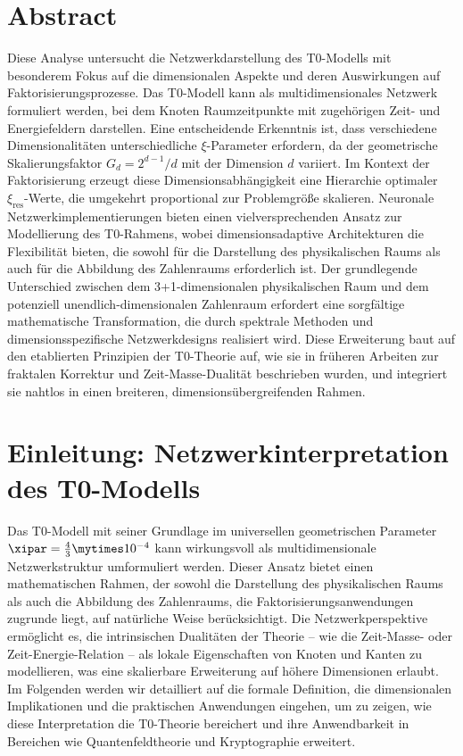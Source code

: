 \section*{Abstract}
	Diese Analyse untersucht die Netzwerkdarstellung des T0-Modells mit besonderem Fokus auf die dimensionalen Aspekte und deren Auswirkungen auf Faktorisierungsprozesse. Das T0-Modell kann als multidimensionales Netzwerk formuliert werden, bei dem Knoten Raumzeitpunkte mit zugehörigen Zeit- und Energiefeldern darstellen. Eine entscheidende Erkenntnis ist, dass verschiedene Dimensionalitäten unterschiedliche $\xi$-Parameter erfordern, da der geometrische Skalierungsfaktor $G_d = 2^{d-1}/d$ mit der Dimension $d$ variiert. Im Kontext der Faktorisierung erzeugt diese Dimensionsabhängigkeit eine Hierarchie optimaler $\xi_{\text{res}}$-Werte, die umgekehrt proportional zur Problemgröße skalieren. Neuronale Netzwerkimplementierungen bieten einen vielversprechenden Ansatz zur Modellierung des T0-Rahmens, wobei dimensionsadaptive Architekturen die Flexibilität bieten, die sowohl für die Darstellung des physikalischen Raums als auch für die Abbildung des Zahlenraums erforderlich ist. Der grundlegende Unterschied zwischen dem 3+1-dimensionalen physikalischen Raum und dem potenziell unendlich-dimensionalen Zahlenraum erfordert eine sorgfältige mathematische Transformation, die durch spektrale Methoden und dimensionsspezifische Netzwerkdesigns realisiert wird. Diese Erweiterung baut auf den etablierten Prinzipien der T0-Theorie auf, wie sie in früheren Arbeiten zur fraktalen Korrektur und Zeit-Masse-Dualität beschrieben wurden, und integriert sie nahtlos in einen breiteren, dimensionsübergreifenden Rahmen.

\section{Einleitung: Netzwerkinterpretation des T0-Modells}
\label{sec:introduction}
Das T0-Modell mit seiner Grundlage im universellen geometrischen Parameter $\xipar = \frac{4}{3} \mytimes 10^{-4}$ kann wirkungsvoll als multidimensionale Netzwerkstruktur umformuliert werden. Dieser Ansatz bietet einen mathematischen Rahmen, der sowohl die Darstellung des physikalischen Raums als auch die Abbildung des Zahlenraums, die Faktorisierungsanwendungen zugrunde liegt, auf natürliche Weise berücksichtigt. Die Netzwerkperspektive ermöglicht es, die intrinsischen Dualitäten der Theorie -- wie die Zeit-Masse- oder Zeit-Energie-Relation -- als lokale Eigenschaften von Knoten und Kanten zu modellieren, was eine skalierbare Erweiterung auf höhere Dimensionen erlaubt. Im Folgenden werden wir detailliert auf die formale Definition, die dimensionalen Implikationen und die praktischen Anwendungen eingehen, um zu zeigen, wie diese Interpretation die T0-Theorie bereichert und ihre Anwendbarkeit in Bereichen wie Quantenfeldtheorie und Kryptographie erweitert.
